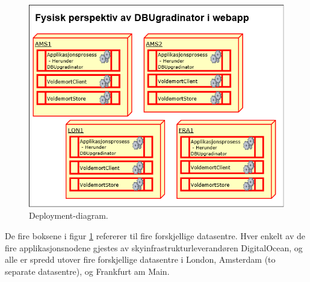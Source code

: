 \begin{figure}[!ht]
    \centering
    \includegraphics[scale=0.6]{fig/dbupgradinator-physical.png}
    \caption{Deployment-diagram.}
    \label{fig10}
\end{figure}

De fire boksene i figur \ref{fig10} refererer til fire forskjellige datasentre. Hver enkelt av de fire applikasjonsnodene gjestes av skyinfrastrukturleverandøren DigitalOcean, og alle er spredd utover fire forskjellige datasentre i London, Amsterdam (to separate datasentre), og Frankfurt am Main.
